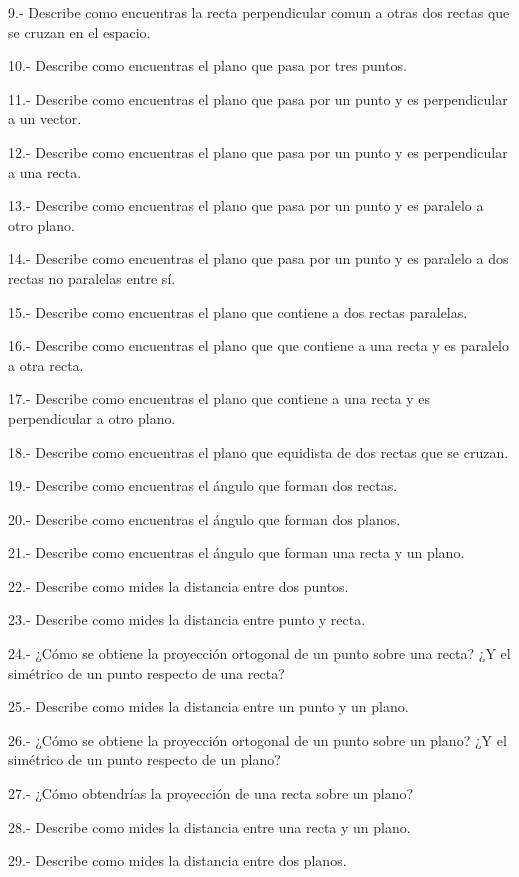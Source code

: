 \begin{enumerate}[Q1. ]
\begin{small}
9.- Describe como encuentras la recta perpendicular comun a otras dos rectas que se cruzan en el espacio. 

10.- Describe como encuentras el plano que pasa por tres puntos. 

11.- Describe como encuentras el plano que pasa por un punto y es perpendicular a un vector. 

12.- Describe como encuentras el plano que pasa por un punto y es perpendicular a una recta.
 
13.- Describe como encuentras el plano que pasa por un punto y es paralelo a otro plano. 

14.- Describe como encuentras el plano que pasa por un punto y es paralelo a dos rectas no paralelas entre sí. 

15.- Describe como encuentras el plano que contiene a dos rectas paralelas.

16.- Describe como encuentras el plano que que contiene a una recta y es paralelo a otra recta. 

17.- Describe como encuentras el plano que contiene a una recta y es perpendicular a otro plano.
 
18.- Describe como encuentras el plano que equidista de dos rectas que se cruzan. 

19.- Describe como encuentras el ángulo que forman dos rectas.
 
20.- Describe como encuentras el ángulo que forman dos planos. 

21.- Describe como encuentras el ángulo que forman una recta y un plano. 

22.- Describe como mides la distancia entre dos puntos. 

23.- Describe como mides la distancia entre punto y recta. 

24.- ¿Cómo se obtiene la proyección ortogonal de un punto sobre una recta? ¿Y el simétrico de un punto respecto de una recta? 

25.- Describe como mides la distancia entre un punto y un plano. 

26.- ¿Cómo se obtiene la proyección ortogonal de un punto sobre un plano? ¿Y el simétrico de un punto respecto de un plano? 

27.- ¿Cómo obtendrías la proyección de una recta sobre un plano? 

28.- Describe como mides la distancia entre una recta y un plano.

29.- Describe como mides la distancia entre dos planos.


\end{small}
\end{enumerate}
